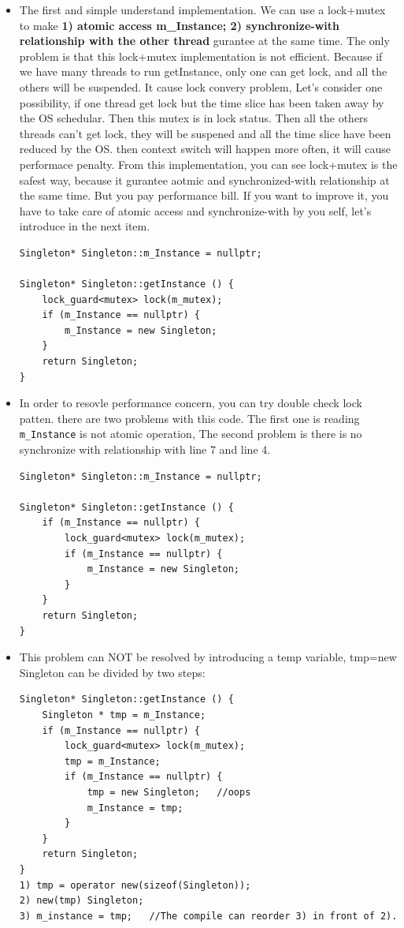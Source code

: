 \documentclass[a4paper,11pt,twoside]{book}
\begin{document}
\begin{itemize}
	

	
	\item The first and simple understand implementation. We can use a lock+mutex to make \textbf{1) atomic access m\_Instance; 2) synchronize-with relationship with the other thread} gurantee at the same time. The only problem is that this lock+mutex implementation is not efficient.  Because if we have many threads to run getInstance, only one can get lock, and all the others will be suspended. It cause lock convery problem, Let's consider one possibility, if one thread get lock but the time slice has been taken away by the OS schedular. Then this mutex is in lock status. Then all the others threads can't get lock,  they will be suspened and all the time slice have been reduced by the OS. then context switch will happen more often, it will cause performace penalty.  From this implementation, you can see lock+mutex is the safest way, because it gurantee aotmic and synchronized-with relationship at the same time. But you pay performance bill. If you want to improve it, you have to take care of atomic access and synchronize-with by you self, let's introduce in the next item.
	
\begin{lstlisting}[]
Singleton* Singleton::m_Instance = nullptr;

Singleton* Singleton::getInstance () {
	lock_guard<mutex> lock(m_mutex);
	if (m_Instance == nullptr) {
		m_Instance = new Singleton;
	}
	return Singleton;
}   	
\end{lstlisting}	
	
	\item In order to resovle performance concern, you can try double check lock patten. there are two problems with this code. The first one is reading \texttt{m\_Instance} is not atomic operation,  The second problem is there is no synchronize with relationship with line 7 and line 4. 
\begin{lstlisting}[]
Singleton* Singleton::m_Instance = nullptr;

Singleton* Singleton::getInstance () {
	if (m_Instance == nullptr) {
		lock_guard<mutex> lock(m_mutex);
		if (m_Instance == nullptr) {
			m_Instance = new Singleton;
		}
	}
	return Singleton;
}	
\end{lstlisting}	
	
	\item This problem can NOT be resolved by introducing a temp variable, tmp=new Singleton can be divided by two steps: 
\begin{lstlisting}[]
Singleton* Singleton::getInstance () {
	Singleton * tmp = m_Instance;
	if (m_Instance == nullptr) {
		lock_guard<mutex> lock(m_mutex);
		tmp = m_Instance;
		if (m_Instance == nullptr) {
			tmp = new Singleton;   //oops
			m_Instance = tmp;  
		}
	}
	return Singleton;
}
1) tmp = operator new(sizeof(Singleton));  
2) new(tmp) Singleton;  
3) m_instance = tmp;   //The compile can reorder 3) in front of 2). 	
\end{lstlisting}	
	

\end{itemize}
\end{document}
